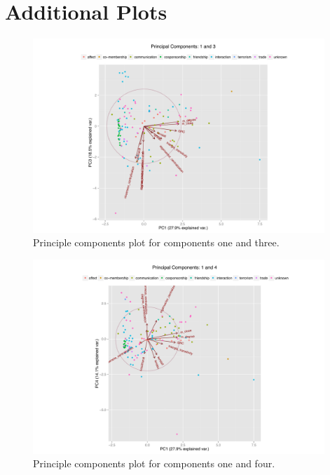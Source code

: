 \documentclass[3p,times]{elsarticle}
\begin{document}


\clearpage
\appendix

\section{Additional Plots}
 \label{sec:PCA Plots}

\begin{figure}
\begin{center}
	\caption{\label{fig:1 and 3} Principle components plot for components one and three.}
		\includegraphics[width = 0.98\textwidth]{./images/Observed_PCA_Components1_3.pdf}
\end{center}
\end{figure}

\begin{figure}
\begin{center}
	\caption{\label{fig:1 and 4} Principle components plot for components one and four.}
		\includegraphics[width = 0.98\textwidth]{./images/Observed_PCA_Components1_4.pdf}
\end{center}
\end{figure}
\end{document}
